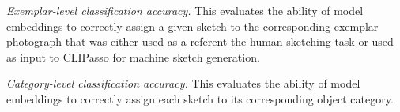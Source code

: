 \documentclass[10pt,letterpaper]{article}
\makeatletter
\newcommand{\hh}[1]{\textcolor{Blue}{@hh: #1}}
\newcommand{\cl}[1]{\textcolor{Green}{@cl: #1}}
\makeatother
\begin{document}


    \textit{Exemplar-level classification accuracy.} This evaluates the ability of model embeddings to correctly assign a given sketch to the corresponding exemplar photograph that was either used as a referent the human sketching task or used as input to CLIPasso for machine sketch generation.
    
    
    \textit{Category-level classification accuracy.} This evaluates the ability of model embeddings to correctly assign each sketch to its corresponding object category. 
    
    
\end{document}
